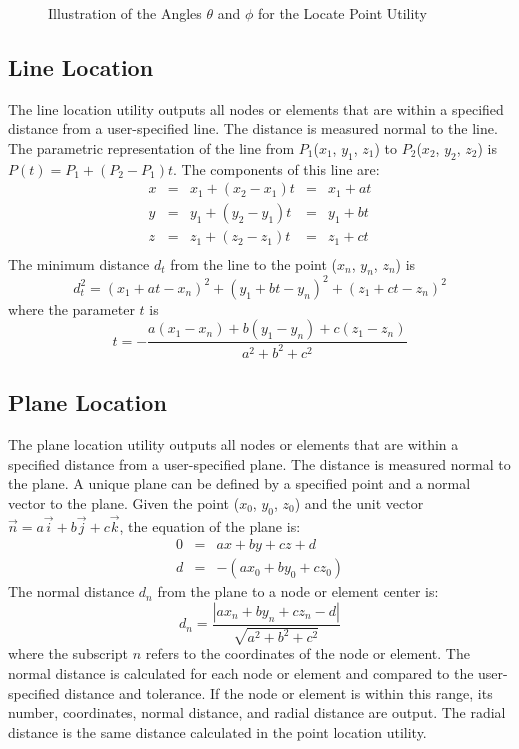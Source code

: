 \begin{figure}
\caption{Illustration of the Angles $\theta$ and $\phi$
for the Locate Point Utility}\label{f:theta}
\end{figure}

\subsection{Line Location}\label{sec:llocate}
The line location utility outputs all nodes or elements that are within
a specified distance from a user-specified line.  The distance is
measured normal to the line.   The parametric representation of the line
from $P_1$($x_1$, $y_1$, $z_1$) to $P_2$($x_2$, $y_2$, $z_2$) is $P(t) =
P_1 + (P_2 - P_1)t$.  The components of this line are:
\begin{equation}
\begin{array}{ccccc}
x &=& x_1 + (x_2 - x_1) t &=& x_1 + at   \\
y &=& y_1 + (y_2 - y_1) t &=& y_1 + bt   \\
z &=& z_1 + (z_2 - z_1) t &=& z_1 + ct   \\
\end{array}
\end{equation}
The minimum distance $d_t$ from the line to the point ($x_n$, $y_n$, $z_n$)
is
\begin{equation}
d_t^2 = (x_1+at-x_n)^2 +(y_1+bt-y_n)^2 +(z_1+ct-z_n)^2
\end{equation}
where the parameter $t$ is
\begin{equation}
t = -\frac{a(x_1-x_n) + b(y_1-y_n) +
c(z_1-z_n)}{a^2+b^2+c^2}\label{parametric}
\end{equation}

\subsection{Plane Location}\label{sec:slocate}
The plane location utility outputs all nodes or elements that are within
a specified distance from a user-specified plane.  The distance is
measured normal to the plane. A unique plane can be defined by a
specified point and a normal vector to the plane.  Given the point
($x_0$, $y_0$, $z_0$) and the unit vector $\vec{n} = a\vec{i} + b\vec{j} +
c\vec{k}$, the equation of the plane is:
\begin{eqnarray}
0 &=& ax + by + cz + d      \label{plane} \\
d &=& -( ax_0 + by_0 + cz_0 )
\end{eqnarray}
The normal distance $d_n$ from the plane to a node or
element center is:
\begin{equation}
d_n = \frac{\left| a x_n + b y_n + c z_n - d\right|}%
                                    {\sqrt{a^2 + b^2 + c^2}}
\end{equation}
where the subscript $n$ refers to the coordinates of the node or
element.  The normal distance is calculated for each node or element and
compared to the user-specified distance and tolerance.  If the node or
element is within this range, its number, coordinates, normal distance,
and radial distance are output.  The radial distance is the same
distance calculated in the point location utility.

